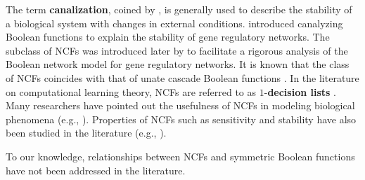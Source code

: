 The term \textbf{canalization}, coined by
\citet{Waddington-1942}, is generally used to describe
the stability of a biological system with changes
in external conditions.
\citet{Kauffman-1969} introduced canalyzing Boolean functions
to explain the stability of gene regulatory networks.
The subclass of NCFs was
introduced later by \citet{Kauffman-etal-2003} 
to facilitate a rigorous analysis of the Boolean network model
for gene regulatory networks.
It is known that the class of NCFs coincides with that
of unate cascade Boolean functions \citep{Jarrah-etal-2007}.
In the literature on computational learning theory,
NCFs are referred to as $1$-\textbf{decision lists} \citep{KV-1994}.
Many researchers have pointed out the usefulness of NCFs 
in modeling biological phenomena 
(e.g., \cite{Layne-2011,
Layne-etal-2012,Li-etal-2011,Li-etal-2012,Li-etal-2013}).
Properties of NCFs such as sensitivity and 
stability have also been studied in the 
literature (e.g., \cite{Kauffman-etal-2004, Layne-2011,Layne-etal-2012,
Li-etal-2011,Li-etal-2013,Klotz-etal-2013, Stearns-etal-2018}). 

To our knowledge, relationships between NCFs and symmetric
Boolean functions have not been addressed in the literature.
